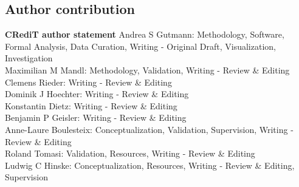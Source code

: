 \documentclass[referee,lineno,pdflatex,sn-nature]{sn-jnl}%
\theoremstyle{thmstyleone}%
\theoremstyle{thmstyletwo}%
\theoremstyle{thmstylethree}%
\begin{document}
\subsection*{Author contribution}
\textbf{CRediT author statement}
Andrea S Gutmann: Methodology, Software, Formal Analysis, Data Curation, Writing - Original Draft, Visualization, Investigation\\
Maximilian M Mandl: Methodology, Validation, Writing - Review \& Editing\\
Clemens Rieder: Writing - Review \& Editing\\
Dominik J Hoechter: Writing - Review \& Editing\\
Konstantin Dietz: Writing - Review \& Editing\\
Benjamin P Geisler: Writing - Review \& Editing\\
Anne-Laure Boulesteix: Conceptualization, Validation, Supervision, Writing - Review \& Editing\\
Roland Tomasi: Validation, Resources, Writing - Review \& Editing\\
Ludwig C Hinske: Conceptualization, Resources, Writing - Review \& Editing, Supervision



\end{document}

